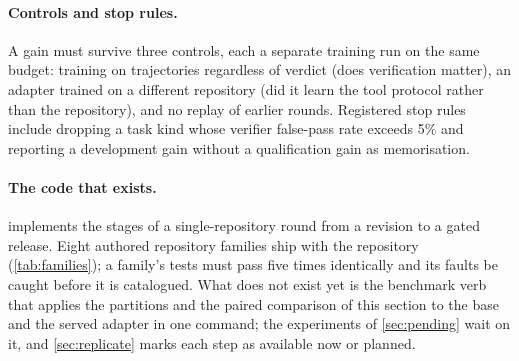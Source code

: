 \paragraph{Controls and stop rules.} A gain must survive three controls, each a separate
training run on the same budget: training on trajectories regardless of verdict (does
verification matter), an adapter trained on a different repository (did it learn the tool
protocol rather than the repository), and no replay of earlier rounds. Registered
stop rules include dropping a task kind whose verifier false-pass rate exceeds 5\% and reporting
a development gain without a qualification gain as memorisation.

\paragraph{The code that exists.}  implements the stages of a
single-repository round from a revision to a gated release. Eight authored repository
families ship with the repository (\cref{tab:families}); a family's tests must pass five times
identically and its faults be caught before it is catalogued. What does not exist
yet is the benchmark verb that applies the partitions and the paired comparison of this section
to the base and the served adapter in one command; the experiments of \cref{sec:pending} wait on
it, and \cref{sec:replicate} marks each step as available now or planned.
